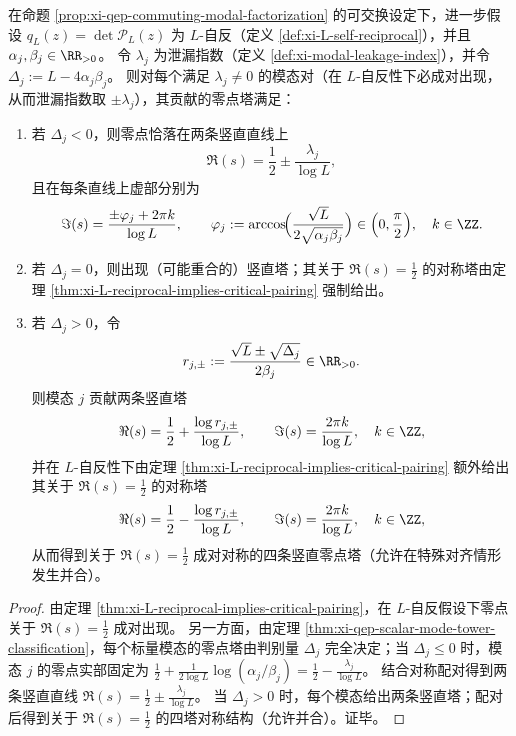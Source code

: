 \begin{corollary}\label{cor:xi-qep-leakage-spectrum-commuting}
在命题 \ref{prop:xi-qep-commuting-modal-factorization} 的可交换设定下，进一步假设 \(q_L(z)=\det \mathcal{P}_L(z)\) 为 \(L\)-自反（定义 \ref{def:xi-L-self-reciprocal}），并且 \(\alpha_j,\beta_j\in\RR_{>0}\)。
令 \(\lambda_j\) 为泄漏指数（定义 \ref{def:xi-modal-leakage-index}），并令 \(\Delta_j:=L-4\alpha_j\beta_j\)。
则对每个满足 \(\lambda_j\neq 0\) 的模态对（在 \(L\)-自反性下必成对出现，从而泄漏指数取 \(\pm\lambda_j\)），其贡献的零点塔满足：
\begin{enumerate}
  \item 若 \(\Delta_j<0\)，则零点恰落在两条竖直直线上
  \[
  \Re(s)=\frac12\pm\frac{\lambda_j}{\log L},
  \]
  且在每条直线上虚部分别为
  \[
  \Im(s)=\frac{\pm\varphi_j+2\pi k}{\log L},
  \qquad
  \varphi_j:=\arccos\!\Bigl(\frac{\sqrt L}{2\sqrt{\alpha_j\beta_j}}\Bigr)\in\Bigl(0,\frac{\pi}{2}\Bigr),
  \quad k\in\ZZ.
  \]
  \item 若 \(\Delta_j=0\)，则出现（可能重合的）竖直塔；其关于 \(\Re(s)=\tfrac12\) 的对称塔由定理 \ref{thm:xi-L-reciprocal-implies-critical-pairing} 强制给出。
  \item 若 \(\Delta_j>0\)，令
  \[
  r_{j,\pm}:=\frac{\sqrt L\pm\sqrt{\Delta_j}}{2\beta_j}\in\RR_{>0}.
  \]
  则模态 \(j\) 贡献两条竖直塔
  \[
  \Re(s)=\frac12+\frac{\log r_{j,\pm}}{\log L},
  \qquad
  \Im(s)=\frac{2\pi k}{\log L},
  \quad k\in\ZZ,
  \]
  并在 \(L\)-自反性下由定理 \ref{thm:xi-L-reciprocal-implies-critical-pairing} 额外给出其关于 \(\Re(s)=\tfrac12\) 的对称塔
  \[
  \Re(s)=\frac12-\frac{\log r_{j,\pm}}{\log L},
  \qquad
  \Im(s)=\frac{2\pi k}{\log L},
  \quad k\in\ZZ,
  \]
  从而得到关于 \(\Re(s)=\tfrac12\) 成对对称的四条竖直零点塔（允许在特殊对齐情形发生并合）。
\end{enumerate}
\end{corollary}

\begin{proof}
由定理 \ref{thm:xi-L-reciprocal-implies-critical-pairing}，在 \(L\)-自反假设下零点关于 \(\Re(s)=\tfrac12\) 成对出现。
另一方面，由定理 \ref{thm:xi-qep-scalar-mode-tower-classification}，每个标量模态的零点塔由判别量 \(\Delta_j\) 完全决定；当 \(\Delta_j\le 0\) 时，模态 \(j\) 的零点实部固定为
\(
\frac12+\frac{1}{2\log L}\log(\alpha_j/\beta_j)=\frac12-\frac{\lambda_j}{\log L}
\)。
结合对称配对得到两条竖直直线 \(\Re(s)=\frac12\pm\frac{\lambda_j}{\log L}\)。
当 \(\Delta_j>0\) 时，每个模态给出两条竖直塔；配对后得到关于 \(\Re(s)=\tfrac12\) 的四塔对称结构（允许并合）。证毕。
\end{proof}

